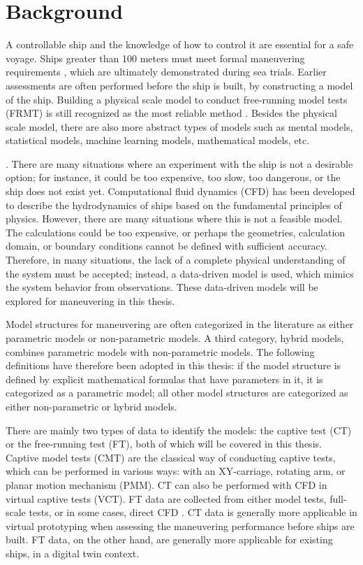 \section{Background}
A controllable ship and the knowledge of how to control it are essential for a safe voyage. Ships greater than 100 meters must meet formal maneuvering requirements \cite{imoStandardsShipManoeuvrability2002}, which are ultimately demonstrated during sea trials. Earlier assessments are often performed before the ship is built, by constructing a model of the ship. Building a physical scale model to conduct free-running model tests (FRMT) is still recognized as the most reliable method \cite{ittcManeuveringCommitteeITTC2008}. Besides the physical scale model, there are also more abstract types of models such as mental models, statistical models, machine learning models, mathematical models, etc.

 \cite{ljungModelingIdentificationDynamic2021}. There are many situations where an experiment with the ship is not a desirable option; for instance, it could be too expensive, too slow, too dangerous, or the ship does not exist yet. Computational fluid dynamics (CFD) has been developed to describe the hydrodynamics of ships based on the fundamental principles of physics. However, there are many situations where this is not a feasible model. The calculations could be too expensive, or perhaps the geometries, calculation domain, or boundary conditions cannot be defined with sufficient accuracy. Therefore, in many situations, the lack of a complete physical understanding of the system must be accepted; instead, a data-driven model is used, which mimics the system behavior from observations. These data-driven models will be explored for maneuvering in this thesis.

Model structures for maneuvering are often categorized in the literature as either parametric models or non-parametric models. A third category, hybrid models, combines parametric models with non-parametric models. The following definitions have therefore been adopted in this thesis: if the model structure is defined by explicit mathematical formulas that have parameters in it, it is categorized as a parametric model; all other model structures are categorized as either non-parametric or hybrid models.

There are mainly two types of data to identify the models: the captive test (CT) or the free-running test (FT), both of which will be covered in this thesis. Captive model tests (CMT) are the classical way of conducting captive tests, which can be performed in various ways: with an XY-carriage, rotating arm, or planar motion mechanism (PMM). CT can also be performed with CFD in virtual captive tests (VCT). FT data are collected from either model tests, full-scale tests, or in some cases, direct CFD \cite{arakiEstimatingManeuveringCoefficients2012}. CT data is generally more applicable in virtual prototyping when assessing the maneuvering performance before ships are built. FT data, on the other hand, are generally more applicable for existing ships, in a digital twin context.

